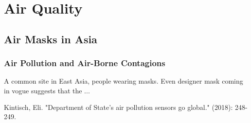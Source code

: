 \chapter{Air Quality}\label{ch:air_quality}

\section{Air Masks in Asia}

\subsection{Air Pollution and Air-Borne Contagions}

A common site in East Asia, people wearing masks. Even designer mask coming in vogue suggests that the ...


Kintisch, Eli. "Department of State's air pollution sensors go global." (2018): 248-249.